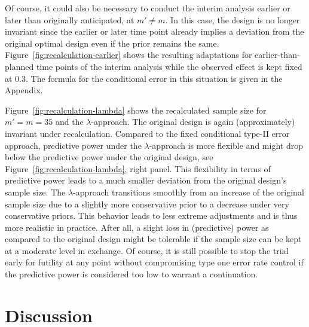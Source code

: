 \documentclass[12pt]{article}
\begin{document}
Of course, it could also be necessary to conduct the interim analysis earlier or later than originally anticipated, at $m'\neq m$.
In this case, the design is no longer invariant since the earlier
or later time point already implies a deviation from the
original optimal design even if the prior remains the same.
Figure~\ref{fig:recalculation-earlier} shows the resulting adaptations
for earlier-than-planned time points of the interim analysis
while the observed effect is kept fixed at $0.3$.
The formula for the conditional error in this situation is given in the Appendix.

Figure~\ref{fig:recalculation-lambda} shows the recalculated sample size
for $m'=m=35$ and the $\lambda$-approach.
The original design is again (approximately) invariant under recalculation.
Compared to the fixed conditional type-II error approach, predictive power
under the $\lambda$-approach is more flexible and might drop below the predictive power under the original design, see Figure~\ref{fig:recalculation-lambda}, right panel.
This flexibility in terms of predictive power leads to a much smaller deviation from the original design's sample size.
The $\lambda$-approach transitions smoothly from
an increase of the original sample size due to a slightly more conservative prior to a decrease under very conservative priors.
This behavior leads to less extreme adjustments and is thus
more realistic in practice.
After all, a slight loss in (predictive) power as compared to the
original design might be tolerable if the sample size can be kept at
a moderate level in exchange.
Of course, it is still possible to stop the trial early for futility
at any point without compromising type one error rate control
if the predictive power is considered too low to warrant a continuation.



\section{Discussion} %
\end{document}
